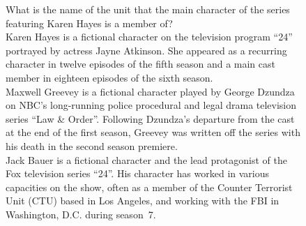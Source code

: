 \begin{figure}[htbp]
\begin{tcolorbox}[
    colback=gray!5!white,
    colframe=gray!75!black,
    title=Prompt,
    fonttitle=\bfseries,
    breakable,
    enhanced,
    fontupper=\ttfamily\footnotesize,
]
What is the name of the unit that the main character of the series featuring Karen Hayes is a member of?\\
 Karen Hayes is a fictional character on the television program ``24'' portrayed by actress Jayne Atkinson. She appeared as a recurring character in twelve episodes of the fifth season and a main cast member in eighteen episodes of the sixth season.\\
 Maxwell Greevey is a fictional character played by George Dzundza on NBC's long-running police procedural and legal drama television series ``Law \& Order''. Following Dzundza's departure from the cast at the end of the first season, Greevey was written off the series with his death in the second season premiere.\\
 Jack Bauer is a fictional character and the lead protagonist of the Fox television series ``24''. His character has worked in various capacities on the show, often as a member of the Counter Terrorist Unit (CTU) based in Los Angeles, and working with the FBI in Washington, D.C. during season~7.
\end{tcolorbox}


\end{figure}
